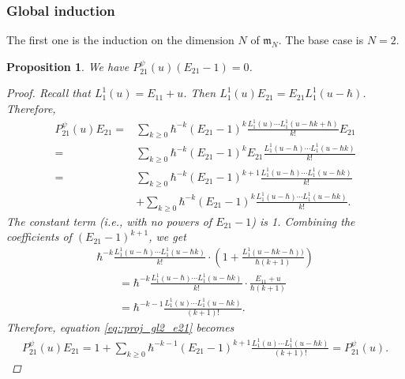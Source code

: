 \documentclass[10pt,a4paper]{article}
\numberwithin{equation}{section}
\newtheorem{Proposition}[Theorem]{Proposition}
{ \theoremstyle{definition}
	\newtheorem{Definition}[Theorem]{Definition}
	\newtheorem{Note}[Theorem]{Note}
	\newtheorem{Example}[Theorem]{Example}
	\newtheorem{Remark}[Theorem]{Remark} }
\newcommand{\m}{\mathfrak{m}}
\begin{document}
	\subsubsection{Global induction}
	
	The first one is the induction on the dimension $N$ of $\m_N$. The base case is $N=2$.
	
	\begin{Proposition}
		\label{prop::gl2_proj_inv}
		We have $P_{21}^{\psi}(u) (E_{21} - 1) = 0$.
		\begin{proof}
			Recall that $L_1^1(u) = E_{11} + u$. Then
$
			L_1^1(u) E_{21} = E_{21} L_1^1(u-\hbar)$.
			Therefore,
			\begin{align}
					P_{21}^{\psi}(u) E_{21}={}& \sum\limits_{k\geq 0} \hbar^{-k} (E_{21} -1)^k \frac{L_1^1(u) \cdots L_1^1(u - \hbar k+\hbar)}{k!} E_{21} \nonumber \\
					={}& \sum\limits_{k\geq 0} \hbar^{-k} (E_{21} -1)^k E_{21} \frac{L_1^1(u-\hbar) \cdots L_1^1(u - \hbar k)}{k!} \nonumber \\
					={}& \sum\limits_{k\geq 0} \hbar^{-k} (E_{21}-1)^{k+1} \frac{L_1^1(u-\hbar) \cdots L_1^1(u - \hbar k)}{k!} \nonumber \\
					&+\sum\limits_{k\geq 0} \hbar^{-k} (E_{21}-1)^{k} \frac{L_1^1(u-\hbar) \cdots L_1^1(u - \hbar k)}{k!}.	\label{eq::proj_gl2_e21}
			\end{align}
			The constant term (i.e., with no powers of $E_{21}-1$) is 1. Combining the coefficients of $(E_{21}-1)^{k+1}$, we get
			\begin{gather*}
				\hbar^{-k} \frac{L_1^1(u-\hbar) \cdots L_1^1(u - \hbar k)}{k!} \cdot \left( 1 + \frac{L_1^1(u-\hbar k-\hbar))}{\hbar(k+1)} \right) \\
				\qquad= \hbar^{-k} \frac{L_1^1(u-\hbar) \cdots L_1^1(u - \hbar k)}{k!} \cdot \frac{E_{11} + u}{\hbar(k+1)} \\
				\qquad= \hbar^{-k-1} \frac{L_1^1(u)\cdots L_1^1(u-\hbar k)}{(k+1)!}.
			\end{gather*}
			Therefore, equation \eqref{eq::proj_gl2_e21} becomes
			\begin{align*}
				P_{21}^{\psi}(u) E_{21} = 1 + \sum\limits_{k \geq 0} \hbar^{-k-1} (E_{21}-1)^{k+1} \frac{L_1^1(u) \cdots L_1^1(u-\hbar k)}{(k+1)!} = P_{21}^{\psi}(u).\tag*{\qed}
			\end{align*}\renewcommand{\qed}{}
		\end{proof}
	\end{Proposition}
	
\end{document}
